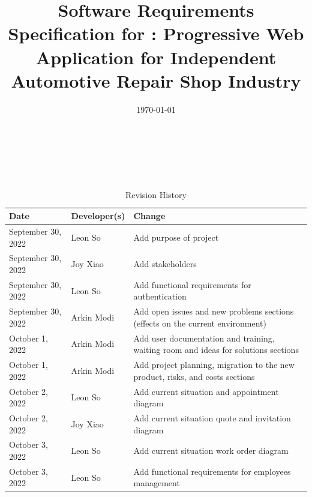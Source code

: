 \documentclass[12pt]{article}
\begin{document}
\title{Software Requirements Specification for \progname: Progressive Web Application for Independent
	Automotive Repair Shop Industry}
\author{\authname}
\date{\today}

\maketitle

~\newpage


\tableofcontents

~\newpage

\begin{table}[hp]
	\caption{Revision History} \label{TblRevisionHistory}
	\begin{tabularx}{\textwidth}{llX}
		\toprule
		\textbf{Date}      & \textbf{Developer(s)} & \textbf{Change}                                                                    \\
		\midrule
		September 30, 2022 & Leon So               & Add purpose of project                                                             \\
		September 30, 2022 & Joy Xiao              & Add stakeholders                                                                   \\
		September 30, 2022 & Leon So               & Add functional requirements for authentication                                     \\
		September 30, 2022 & Arkin Modi            & Add open issues and new problems sections (effects on the current environment)     \\
		October 1, 2022    & Arkin Modi            & Add user documentation and training, waiting room and ideas for solutions sections \\
		October 1, 2022    & Arkin Modi            & Add project planning, migration to the new product, risks, and costs sections      \\
		October 2, 2022    & Leon So               & Add current situation and appointment diagram                                      \\
		October 2, 2022    & Joy Xiao              & Add current situation quote and invitation diagram                                 \\
		October 3, 2022    & Leon So               & Add current situation work order diagram                                           \\
		October 3, 2022    & Leon So               & Add functional requirements for employees management                               \\

\end{tabularx}
\end{table}
\end{document}
